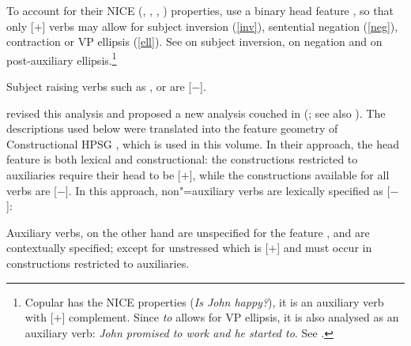 To account for their NICE (, , , ) properties, \citet{KS2002a} %
use a binary head feature \aux, so that only [\aux $+$] verbs may allow for subject inversion
(\ref{inv}), sentential negation (\ref{neg}), contraction or VP ellipsis (\ref{ell}). See
 on subject inversion,
 on negation and
 on post-auxiliary ellipsis.\footnote{Copular  has
  the NICE properties (\textit{Is John happy?}), it is an auxiliary verb with [\prd $+$]
  complement. Since \emph{to} allows for VP ellipsis, it is also analysed as an auxiliary verb:
  \emph{John promised to work and he started to}. See .} 

\eal
{}
\zl

\noindent
Subject raising verbs such as ,  or  are [\aux $-$].

\citet{Sagetal2020} revised this analysis and proposed a new analysis couched in \sbcg (\citealp{Sag2012a}; see also ). The descriptions used below were translated into the feature geometry of Constructional HPSG \citep{Sag97a}, which is used in this volume. In their approach, the head feature \aux is both lexical and constructional: the constructions restricted to auxiliaries require their head to be [\aux $+$], while the constructions available for all verbs are [\aux $-$]. In this approach, non"=auxiliary verbs are lexically specified as [\aux $-$]:

\begin{exe}
\ex {} \impl
{}
\end{exe}

 Auxiliary verbs, on the other hand are unspecified for the feature \aux, and are contextually specified; except for unstressed   which is [\aux $+$] and must occur in constructions restricted to auxiliaries.

\eal
\settowidth{}
 \label{inv1}
\label{inv2}
\zl


